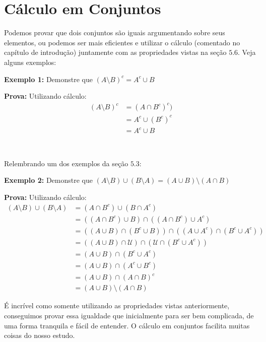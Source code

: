\section{Cálculo em Conjuntos}
Podemos provar que dois conjuntos são iguais argumentando sobre seus elementos, ou podemos ser mais eficientes e utilizar o cálculo (comentado no capítulo de introdução) juntamente com as propriedades vistas na seção $5.6$. Veja alguns exemplos:

\textbf{Exemplo 1:} Demonstre que $(A \setminus B)^c = A^c \cup B$

\textbf{Prova:} Utilizando cálculo:
\begin{equation*}
\begin{aligned}
  (A \setminus B)^c &= (A \cap B^c)^c)\\
  &= A^c \cup (B^c)^c\\
  & = A^c \cup B
\end{aligned}
\end{equation*}

$\qquad$

Relembrando um dos exemplos da seção $5.3$:

\textbf{Exemplo 2:} Demonstre que $(A \setminus B) \cup (B \setminus A) = (A \cup B) \setminus (A \cap B)$

\textbf{Prova:} Utilizando cálculo:
\begin{equation*}
\begin{aligned}
  (A \setminus B) \cup (B \setminus A) &= (A \cap B^c) \cup (B \cap A^c)\\
  &= ((A \cap B^c) \cup B) \cap ((A \cap B^c) \cup A^c)\\
  &= ((A \cup B) \cap (B^c \cup B)) \cap ((A \cup A^c) \cap (B^c \cup A^c))\\
  &= ((A \cup B) \cap \mathcal U) \cap (\mathcal U \cap (B^c \cup A^c))\\
  &= (A \cup B) \cap (B^c \cup A^c)\\
  &= (A \cup B) \cap (A^c \cup B^c)\\
  &= (A \cup B) \cap (A \cap B)^c\\
  &= (A \cup B) \setminus (A \cap B)
\end{aligned}
\end{equation*}

É incrível como somente utilizando as propriedades vistas anteriormente, conseguimos provar essa igualdade que inicialmente para ser bem complicada, de uma forma tranquila e fácil de entender. O cálculo em conjuntos facilita muitas coisas do nosso estudo.

